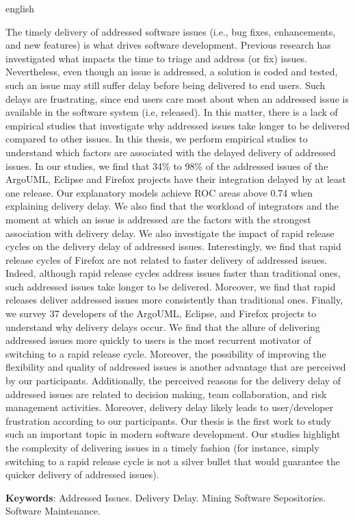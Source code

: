 \begin{resumo}[Abstract]
 \begin{otherlanguage*}{english}

	 The timely delivery of addressed software issues (i.e., bug fixes,
	 enhancements, and new features) is what drives software development.
	 Previous research has investigated what impacts the time to triage and
	 address (or fix) issues. Nevertheless, even though an issue is
	 addressed, \ie a solution is coded and tested, such an issue may still
	 suffer delay before being delivered to end users. Such delays are
	 frustrating, since end users care most about when an addressed issue is
	 available in the software system (i.e, released). In this matter, there
	 is a lack of empirical studies that investigate why addressed issues
	 take longer to be delivered compared to other issues. In this thesis,
	 we perform empirical studies to understand which factors are associated
	 with the delayed delivery of addressed issues. In our studies, we find
	 that 34\% to 98\% of the addressed issues of the ArgoUML, Eclipse and
	 Firefox projects have their integration delayed by at least one
	 release. Our explanatory models achieve ROC areas above 0.74 when
	 explaining delivery delay. We also find that the workload of
	 integrators and the moment at which an issue is addressed are the
	 factors with the strongest association with delivery delay.  We also
	 investigate the impact of rapid release cycles on the delivery delay of
	 addressed issues. Interestingly, we find that rapid release cycles of
	 Firefox are not related to faster delivery of addressed issues. Indeed,
	 although rapid release cycles address issues faster than traditional
	 ones, such addressed issues take longer to be delivered. Moreover, we find
	 that rapid releases deliver addressed issues more consistently than
	 traditional ones. Finally, we survey 37 developers of the ArgoUML,
	 Eclipse, and Firefox projects to understand why delivery delays occur.
	 We find that the allure of delivering addressed issues more quickly to
	 users is the most recurrent motivator of switching to a rapid release
	 cycle. Moreover, the possibility of improving the flexibility and quality of
	 addressed issues is another advantage that are perceived by our
	 participants. Additionally, the perceived reasons for the delivery
	 delay of addressed issues are related to decision making, team
	 collaboration, and risk management activities. Moreover, delivery delay
	 likely leads to user/developer frustration according to our
	 participants. Our thesis is the first work to study such an important
	 topic in modern software development. Our studies highlight the
	 complexity of delivering issues in a timely fashion (for instance,
	 simply switching to a rapid release cycle is not a silver bullet that
	 would guarantee the quicker delivery of addressed issues).

   \vspace{\onelineskip}
 
   \noindent 
   \textbf{Keywords}: Addressed Issues. Delivery Delay. Mining Software
   Sepositories. Software Maintenance.
 \end{otherlanguage*}
\end{resumo}

